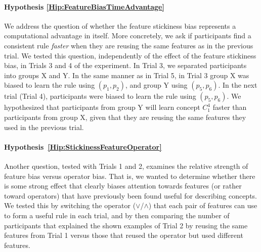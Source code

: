 \paragraph{Hypothesis \ref{Hip:FeatureBiasTimeAdvantage}} 
We address the question of whether the feature stickiness bias represents a computational advantage in itself. More concretely, we ask if participants find a consistent rule {\it faster} when they are reusing the same features as in the previous trial.
We tested this question, independently of the effect of the feature stickiness bias, in Trials 3 and 4 of the experiment. In Trial 3, we separated participants into groups X and Y. In the same manner as in Trial 5, in Trial 3 group X was biased to learn the rule using $(p_1, p_2)$, and group Y using $(p_5, p_6)$. In the next trial (Trial 4), participants were biased to learn the rule using $(p_5, p_6)$. We hypothesized that participants from group Y will learn concept $C^4_1$ faster than participants from group X, given that they are reusing the same features they used in the previous trial.


 \paragraph{Hypothesis~\ref{Hip:StickinessFeatureOperator}} 
 Another question, tested with Trials 1 and 2, examines the relative strength of feature bias versus operator bias. That is, we wanted to determine whether there is some strong effect that clearly biases attention towards features (or rather toward operators) that have previously been found useful for describing concepts. We tested this by switching the operator ($\lor$/$\land$) that each pair of features can use to form a useful rule in each trial, and by then comparing the number of participants that explained the shown examples of Trial 2 by reusing the same features from Trial 1 versus those that reused the operator but used different features.
 
    
